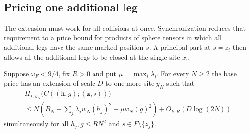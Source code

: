 \subsection{Pricing one additional leg}

The extension must work for all collisions at once. Synchronization
reduces that requirement to a price bound for products of sphere
tensors in which all additional legs have the same marked position
\(s\). A principal part at \(s=z_i\) then allows all the additional
legs to be closed at the single site \(x_i\).

\begin{lemma}\label{lem:sphere-added}
Suppose \(\omega_F<9/4\), fix \(R>0\) and put \(\mu=\max_i\lambda_i\).
For every \(N\ge2\) the base price has an extension of scale \(D\) to
one more site \(y_N\) such that
\begin{multline}\label{eq:sphere-aux}
 H_{\mathbf x,y_N}\bigl(C((\mathbf h,g);(\mathbf z,s))\bigr)\\
 \le N\left(B_N+\sum_j\lambda_j w_N(h_j)^2+\mu w_N(g)^2\right)
       + O_{k,R}(D\log(2N))
\end{multline}
simultaneously for all \(h_j,g\le RN^2\) and \(s\in F\setminus\{z_j\}\).
\end{lemma}

